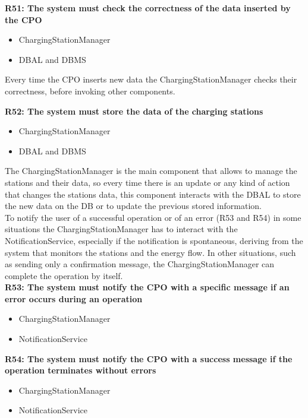 \textbf{R51: The system must check the correctness of the data inserted by the CPO}
\begin{itemize}
    \item ChargingStationManager
    \item DBAL and DBMS
\end{itemize}
Every time the CPO inserts new data the ChargingStationManager checks their correctness, before invoking other components.

\textbf{R52: The system must store the data of the charging stations}
\begin{itemize}
    \item ChargingStationManager
    \item DBAL and DBMS
\end{itemize}
The ChargingStationManager is the main component that allows to manage the stations and their data, so every time there is an update or any kind of action that changes the stations data, this component interacts with the DBAL to store the new data on the DB or to update the previous stored information.\\

To notify the user of a successful operation or of an error (R53 and R54) in some situations the ChargingStationManager has to interact with the NotificationService, especially if the notification is spontaneous, deriving from the system that monitors the stations and the energy flow. In other situations, such as sending only a confirmation message, the ChargingStationManager can complete the operation by itself. \\ 
\textbf{R53: The system must notify the CPO with a specific message if an error occurs during an operation}
\begin{itemize}
    \item ChargingStationManager
    \item NotificationService
\end{itemize}

\textbf{R54: The system must notify the CPO with a success message if the operation terminates without errors}
\begin{itemize}
    \item ChargingStationManager
    \item NotificationService
\end{itemize}

